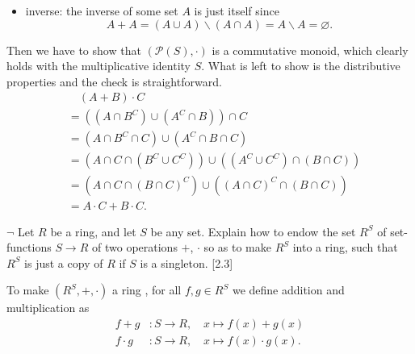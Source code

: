 \documentclass[12pt,letterpaper,boxed]{hmcpset}
\begin{document}
\begin{solution}
\begin{itemize}
\[		\] 
		\item inverse: the inverse of some set $A$ is just itself since
		\[
		A+A=(A \cup A) \backslash(A \cap A)=A\backslash A=\varnothing.
		\]
	\end{itemize}
	Then we have to show that $(\mathscr{P}(S),\cdot)$ is a commutative monoid, which clearly holds with the multiplicative identity $S$. What is left to show is the distributive properties and the check is straightforward.
	\begin{align*}
	&\hspace{1em}(A+B)\cdot C\\
	&=((A \cap B^C) \cup(A^C \cap B))\cap C\\
	&=(A \cap B^C\cap C) \cup(A^C \cap B\cap C)\\
	&=(A\cap C \cap (B^C\cup C^C)) \cup((A^C\cup C^C) \cap (B\cap C))\\
	&=(A\cap C \cap (B\cap C)^C) \cup((A\cap C)^C \cap (B\cap C))\\
	&=A\cdot C+B\cdot C.
	\end{align*}
\end{solution}

\begin{problem}[1.3]
	$\neg$ Let $R$ be a ring, and let $S$ be any set. Explain how to endow the set $R^S$ of set-functions $S\to R$ of two operations $+$, $\cdot$ so as to make $R^S$ into a ring, such that $R^S$ is just a copy of $R$ if $S$ is a singleton. [2.3]
\end{problem}
\begin{solution}
	To make $(R^S,+,\cdot )$ a ring , for all $f,g\in R^S$ we define addition and multiplication as
	\begin{align*}
	f+g&:S\longrightarrow R,\quad x\longmapsto f(x)+g(x)\\
	f\cdot g&:S\longrightarrow R,\quad x\longmapsto f(x)\cdot g(x).
	\end{align*}
\end{solution}
\end{document}
